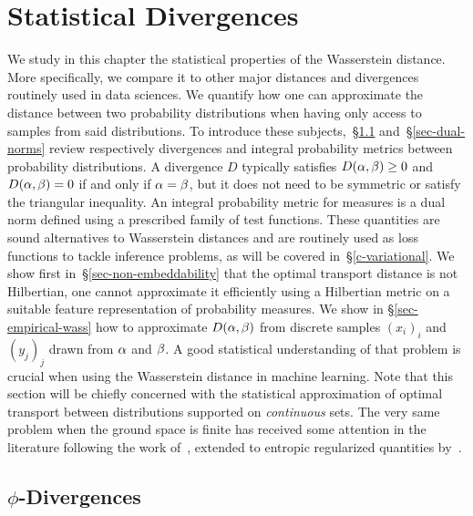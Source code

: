 \newcommand{\myFigRKHS}[1]{\texttt{[image: rkhs/\#1]}}
\chapter{Statistical Divergences}
\label{c-statistical}

We study in this chapter the statistical properties of the Wasserstein distance. More specifically, we compare it to other major distances and divergences routinely used in data sciences. We quantify how one can approximate the distance between two probability distributions when having only access to samples from said distributions. To introduce these subjects,~\S\ref{sec-phi-div} and~\S\ref{sec-dual-norms} review respectively divergences and integral probability metrics between probability distributions. A divergence $D$ typically satisfies $D(\alpha,\beta) \geq 0$ and $D(\alpha,\beta)=0$ if and only if $\alpha=\beta$, but it does not need to be symmetric or satisfy the triangular inequality. An integral probability metric for measures is a dual norm defined using a prescribed family of test functions. These quantities are sound alternatives to Wasserstein distances and are routinely used as loss functions to tackle inference problems, as will be covered in~\S\ref{c-variational}. We show first in~\S\ref{sec-non-embeddability} that the optimal transport distance is not Hilbertian, \ie one cannot approximate it efficiently using a Hilbertian metric on a suitable feature representation of probability measures. We show in \S\ref{sec-empirical-wass} how to approximate $D(\alpha,\beta)$ from discrete samples $(x_i)_i$ and $(y_j)_j$ drawn from $\alpha$ and $\beta$. A good statistical understanding of that problem is crucial when using the Wasserstein distance in machine learning. Note that this section will be chiefly concerned with the statistical approximation of optimal transport between distributions supported on \emph{continuous} sets. The very same problem when the ground space is finite has received some attention in the literature following the work of~\citet{sommerfeld2018inference}, extended to entropic regularized quantities by~\citet{bigot2017central}.


\section{$\phi$-Divergences}
\label{sec-phi-div}

